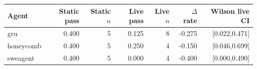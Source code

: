 \begin{tabular}{lrrrrrr}
\hline
Agent & Static pass & Static $n$ & Live pass & Live $n$ & $\Delta$ rate & Wilson live CI \\
\hline
gru & 0.400 & 5 & 0.125 & 8 & -0.275 & [0.022,0.471] \\
honeycomb & 0.400 & 5 & 0.250 & 4 & -0.150 & [0.046,0.699] \\
sweagent & 0.400 & 5 & 0.000 & 4 & -0.400 & [0.000,0.490] \\
\hline
\end{tabular}
